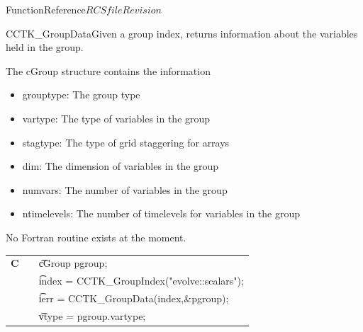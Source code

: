 \begin{cactuspart}{FunctionReference}{$RCSfile$}{$Revision$}
\begin{CCTKFunc}{CCTK\_GroupData}{Given a group index, returns information about the variables held in the group.}
\label{CCTK-GroupData}
\showcargs
\begin{params}
\end{params}
\begin{discussion}
The cGroup structure contains the information
\begin{itemize}
\item grouptype: The group type
\item vartype: The type of variables in the group
\item stagtype: The type of grid staggering for arrays
\item dim: The dimension of variables in the group
\item numvars: The number of variables in the group
\item ntimelevels: The number of timelevels for variables in the group
\end{itemize}
No Fortran routine exists at the moment.
\end{discussion}
\begin{examples}
\begin{tabular}{@{}p{3cm}cp{11cm}}
\hfill {\bf C} && {\t cGroup pgroup;}\\
               && {\t index = CCTK\_GroupIndex("evolve::scalars");}\\
               &&{\t ierr = CCTK\_GroupData(index,\&pgroup);}\\
               && {\t vtype = pgroup.vartype;}
\\
\end{tabular}
\end{examples}
\begin{errorcodes}
\end{errorcodes}
\end{CCTKFunc}



\end{cactuspart}
